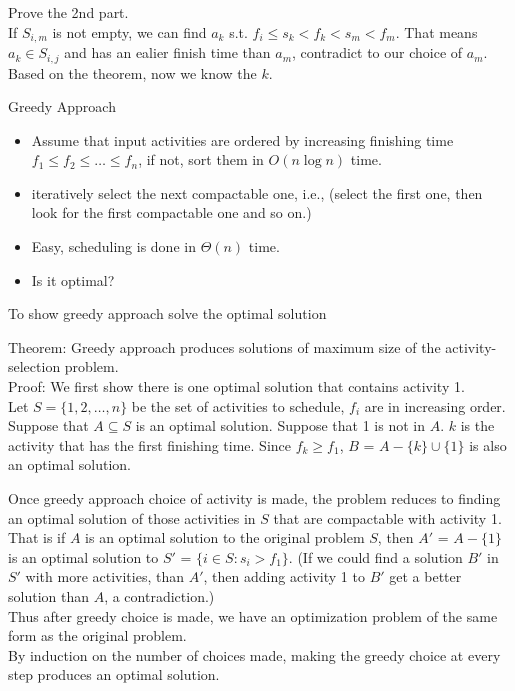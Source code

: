 \documentclass{beamer}
\begin{document}
\begin{frame}{}
\noindent{}Prove the 2nd part. \\
If $S_{i,m}$ is not empty, we can find $a_k$ s.t. $f_i\le s_k < f_k < s_m < f_m$.
That means $a_k \in S_{i,j}$ and has an ealier finish time than $a_m$, contradict to our choice of $a_m$. \\

Based on the theorem, now we know the $k$.
\end{frame}

\begin{frame}{}
\begin{center}
{\large Greedy Approach}
\end{center}
\begin{itemize}
\item Assume that input activities are ordered by increasing finishing time
 $f_1\le f_2 \le \ldots \le f_n$, if not, sort them in $O(n\log n)$ time.  
\item iteratively select the next compactable one, i.e., (select the first one,
 then look for the first compactable one and so on.)
\item Easy, scheduling is done in $\Theta(n)$ time.  
\item Is it optimal?
\end{itemize}
\end{frame}

\begin{frame}{}
\begin{center}
{\large To show greedy approach solve the optimal solution}
\end{center}

Theorem: Greedy approach produces solutions of maximum size of the
 activity-selection problem.  \\ 
Proof: We first show there is one optimal solution that
 contains activity 1.  \\
Let $S=\{1,2,\ldots ,n\}$ be the set of activities to schedule, $f_i$ are in
 increasing order.  
Suppose that $A\subseteq S$ is an optimal solution.  
Suppose that 1 is not in $A$.
$k$ is the activity that has the first finishing time.  Since $f_k\ge f_1$, 
$B$ = $A-\{k\}\cup\{1\}$ is also an optimal solution.  
\end{frame}

\begin{frame}{}
Once greedy approach choice of activity is made, the
 problem reduces to finding an
optimal solution of those activities in $S$ that are
 compactable with activity 1. 
That is if $A$ is an optimal solution to the original problem $S$, then 
$A'$ = $A-\{1\}$ is an optimal solution to $S'$ = $\{i\in S:s_i>f_1\}$.  
{\small (If we could find a solution $B'$ in $S'$ with more activities, than
 $A'$, then adding activity 1 to $B'$ get a better solution than $A$, a
 contradiction.)}  \\
Thus after greedy choice is made, we have an optimization
problem of the same form as the original problem.  \\
By induction on the number
of choices made, making the greedy choice at every step produces an optimal
 solution.  
\end{frame}
\end{document}
